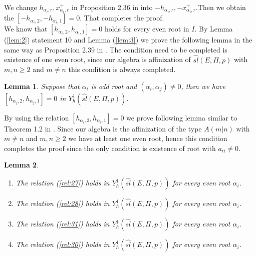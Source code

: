 \documentclass[english]{elsarticle}
\newtheorem{lemma}{Lemma}[section]
\numberwithin{equation}{section}
\begin{document}
We change $h_{\alpha_i,r}, x_{\alpha_i,r}^+$ in Proposition 2.36 in \cite{Guaywork} into $-h_{\alpha_i,r}, -x_{\alpha_i,r}^+$.Then we obtain the $[-h_{\alpha_i,2},-h_{\alpha_i,1}]=0$. That completes the proof.\\

We know that $[h_{\alpha_i,2},h_{\alpha_i,1}]=0$ holds for every even root in $I$. By Lemma (\ref{lem:2}) statement 10 and Lemma (\ref{lem:3}) we prove the following lemma in the same way as Proposition 2.39 in \cite{Guaywork}. The condition need to be completed is existence of one even root, since our algebra is affinization of $\hat{sl}(E,\Pi,p)$ with $m,n\geq 2$ and $m\neq n$ this condition is always completed.

\begin{lemma}
\label{lem:4}
Suppose that $\alpha_i$ is odd root and $(\alpha_i,\alpha_j)\neq 0$, then we have $[h_{\alpha_j,2},h_{\alpha_j,1}]=0$ in $Y_{\hbar}^1(\hat{sl}(E,\Pi,p))$.\\
\end{lemma}

By using the relation  $[h_{\alpha_i,2},h_{\alpha_i,1}]=0$ we prove following lemma similar to Theorem 1.2 in \cite{Levendorski}. Since our algebra is the affinization of the type $A(m|n)$ with $m \neq n$ and $m,n\geq 2$ we have at least one even root, hence this condition completes the proof since the only condition is existence of root with $a_{ii}\neq 0$.

\begin{lemma}
\label{lem:5}
\begin{enumerate}
\item The relation (\ref{rel:27}) holds in $Y_{\hbar}^1(\hat{sl}(E,\Pi,p))$ for every even root $\alpha_i$.
\item The relation (\ref{rel:28}) holds in $Y_{\hbar}^1(\hat{sl}(E,\Pi,p))$ for every even root $\alpha_i$.
\item The relation (\ref{rel:31}) holds in $Y_{\hbar}^1(\hat{sl}(E,\Pi,p))$ for every even root $\alpha_i$.
\item The relation (\ref{rel:30}) holds in $Y_{\hbar}^1(\hat{sl}(E,\Pi,p))$ for every even root $\alpha_i$.
\end{enumerate}
\end{lemma}
\end{document}
